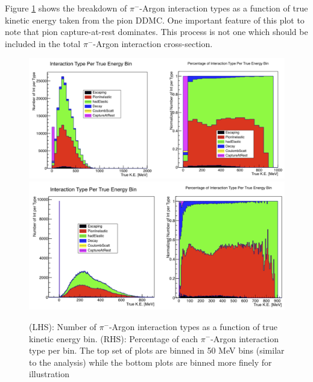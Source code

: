 
Figure \ref{fig:TrueInteractionTypes} shows the breakdown of $\pi^{-}$-Argon interaction types as a function of true kinetic energy taken from the pion DDMC. One important feature of this plot to note that pion capture-at-rest dominates. This process is not one which should be included in the total $\pi^{-}$-Argon interaction cross-section.

\begin{figure}[h!]
\centering
\includegraphics[scale=0.33]{./images/PiArIntTypesTrue.png}
\includegraphics[scale=0.33]{./images/PiArIntTypesTrueFineBin.png}
\caption{(LHS): Number of $\pi^{-}$-Argon interaction types as a function of true kinetic energy bin. (RHS): Percentage of each $\pi^{-}$-Argon interaction type per bin. The top set of plots are binned in 50 MeV bins (similar to the analysis) while the bottom plots are binned more finely for illustration}
\label{fig:TrueInteractionTypes}
\end{figure}

